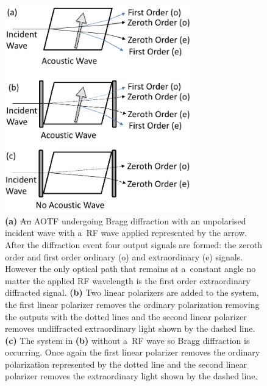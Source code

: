 \documentclass[amtd, online, hvmath]{copernicus}
\providecommand{\DIFadd}[1]{{\protect\color{blue}\uwave{#1}}} %
\providecommand{\DIFdel}[1]{{\protect\color{red}\sout{#1}}}                      %
\providecommand{\DIFaddFL}[1]{\DIFadd{#1}} %
\providecommand{\DIFdelFL}[1]{\DIFdel{#1}} %
\providecommand{\DIFaddbeginFL}{} %
\providecommand{\DIFaddendFL}{} %
\providecommand{\DIFdelbeginFL}{} %
\providecommand{\DIFdelendFL}{} %
\begin{document}
\begin{figure}
\includegraphics[height=90mm]{amt-2015-329-discussions-f02.pdf}
\caption{\textbf{(a)} \DIFdelbeginFL \DIFdelFL{An }\DIFdelendFL \DIFaddbeginFL \DIFaddFL{A representative }\DIFaddendFL AOTF undergoing Bragg diffraction with an
  unpolarised incident wave with a~RF wave applied represented by the
  arrow. After the diffraction event four output signals are formed:
  the zeroth order and first order ordinary (o) and extraordinary (e)
  signals. However the only optical path that remains at a~constant
  angle no matter the applied RF wavelength is the first order
  extraordinary diffracted signal. \textbf{(b)} Two linear polarizers
  are added to the system, the first linear polarizer removes the
  ordinary polarization removing the outputs with the dotted lines and
  the second linear polarizer removes undiffracted extraordinary light
  shown by the dashed line. \textbf{(c)} The system in \textbf{(b)}
  without a~RF wave so Bragg diffraction is occurring. Once again the
  first linear polarizer removes the ordinary polarization represented
  by the dotted line and the second linear polarizer removes the
  extraordinary light shown by the dashed line.}
\label{amtd-2015-0329-f02.pdf}
\end{figure}
\end{document}
